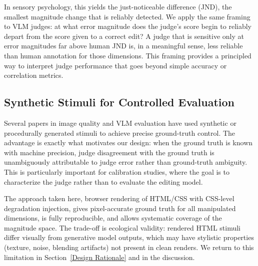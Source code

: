 In sensory psychology, this yields the just-noticeable difference (JND), the smallest magnitude change that is reliably detected. We apply the same framing to VLM judges: at what error magnitude does the judge's score begin to reliably depart from the score given to a correct edit? A judge that is sensitive only at error magnitudes far above human JND is, in a meaningful sense, less reliable than human annotation for those dimensions. This framing provides a principled way to interpret judge performance that goes beyond simple accuracy or correlation metrics.

\subsection{Synthetic Stimuli for Controlled Evaluation}

Several papers in image quality and VLM evaluation have used synthetic or procedurally generated stimuli to achieve precise ground-truth control. %
The advantage is exactly what motivates our design: when the ground truth is known with machine precision, judge disagreement with the ground truth is unambiguously attributable to judge error rather than ground-truth ambiguity. This is particularly important for calibration studies, where the goal is to characterize the judge rather than to evaluate the editing model.

The approach taken here, browser rendering of HTML/CSS with CSS-level degradation injection, gives pixel-accurate ground truth for all manipulated dimensions, is fully reproducible, and allows systematic coverage of the magnitude space. The trade-off is ecological validity: rendered HTML stimuli differ visually from generative model outputs, which may have stylistic properties (texture, noise, blending artifacts) not present in clean renders. We return to this limitation in Section~\ref{Design Rationale} and in the discussion.
